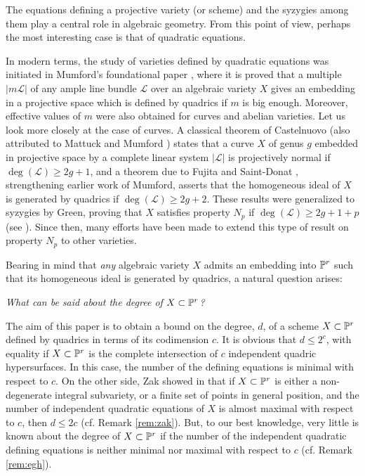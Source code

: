 \documentclass{amsart}
\theoremstyle{definition}
\begin{document}
The equations defining a projective variety (or scheme) and the
syzygies among them play a central role in algebraic geometry. From
this point of view, perhaps the most interesting case is that of
quadratic equations.

In modern terms, the study of varieties defined by quadratic
equations was initiated in Mumford's foundational paper \cite{m},
where it is proved that a multiple $|m{{\mathcal L}}|$ of any ample line bundle
${{\mathcal L}}$ over an algebraic variety $X$ gives an embedding in a
projective space which is defined by quadrics if $m$ is big enough.
Moreover, effective values of $m$ were also obtained for curves and
abelian varieties. Let us look more closely at the case of curves. A
classical theorem of Castelnuovo \cite{c} (also attributed to
Mattuck \cite{mattuck} and Mumford \cite{m}) states that a curve $X$
of genus $g$ embedded in projective space by a complete linear
system $|{{\mathcal L}}|$ is projectively normal if $\deg({{\mathcal L}})\geq 2g+1$, and a
theorem due to Fujita \cite{f} and Saint-Donat \cite{sd},
strengthening earlier work of Mumford, asserts that the homogeneous
ideal of $X$ is generated by quadrics if $\deg({{\mathcal L}})\geq 2g+2$. These
results were generalized to syzygies by Green, proving that $X$
satisfies property $N_p$ if $\deg({{\mathcal L}})\geq 2g+1+p$ (see \cite{g}).
Since then, many efforts have been made to extend this type of
result on property $N_p$ to other varieties.

Bearing in mind that \emph{any} algebraic variety $X$ admits an
embedding into $\Bbb{P}^{r}$ such that its homogeneous ideal is
generated by quadrics, a natural question arises:

\begin{center}
\emph{What can be said about the degree of $X\subset\Bbb{P}^{r}$?}
\end{center}

The aim of this paper is to obtain a bound on the degree, $d$, of a
scheme $X\subset\Bbb{P}^{r}$ defined by quadrics in terms of its
codimension $c$. It is obvious that $d\leq 2^c$, with equality if
$X\subset\Bbb{P}^{r}$ is the complete intersection of $c$
independent quadric hypersurfaces. In this case, the number of the
defining equations is minimal with respect to $c$. On the other
side, Zak showed in \cite{z} that if $X\subset\Bbb{P}^{r}$ is either
a non-degenerate integral subvariety, or a finite set of points in
general position, and the number of independent quadratic equations
of $X$ is almost maximal with respect to $c$, then $d\leq 2c$ (cf.
Remark \ref{rem:zak}). But, to our best knowledge, very little is
known about the degree of $X\subset\Bbb{P}^{r}$ if the number of the
independent quadratic defining equations is neither minimal nor
maximal with respect to $c$ (cf. Remark \ref{rem:egh}).
\end{document}
